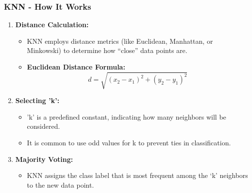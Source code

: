 \documentclass[aspectratio=169]{beamer}
\begin{document}
\begin{frame}[fragile]
    \frametitle{KNN - How It Works}
    \begin{enumerate}
        \item \textbf{Distance Calculation:}
        \begin{itemize}
            \item KNN employs distance metrics (like Euclidean, Manhattan, or Minkowski) to determine how “close” data points are.
            \item \textbf{Euclidean Distance Formula:}
            \begin{equation}
            d = \sqrt{(x_2 - x_1)^2 + (y_2 - y_1)^2}
            \end{equation}
        \end{itemize}
        
        \item \textbf{Selecting 'k':}
        \begin{itemize}
            \item 'k' is a predefined constant, indicating how many neighbors will be considered.
            \item It is common to use odd values for k to prevent ties in classification.
        \end{itemize}

        \item \textbf{Majority Voting:}
        \begin{itemize}
            \item KNN assigns the class label that is most frequent among the ‘k’ neighbors to the new data point.
        \end{itemize}
    \end{enumerate}
\end{frame}
\end{document}
